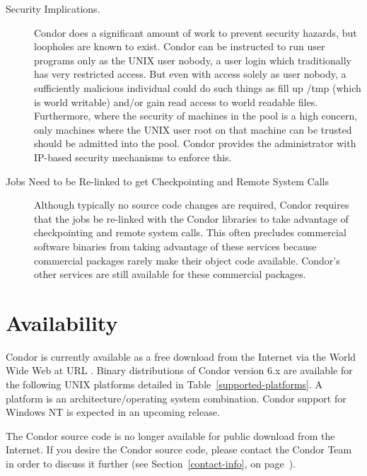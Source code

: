 \begin{description}
	\item[Security Implications.] Condor does a significant amount of work to prevent 
security hazards, but loopholes are known to exist.  Condor can be instructed 
to run user programs only as the UNIX user nobody, a user login which traditionally has very 
restricted access.  But even with access solely as user nobody, a sufficiently 
malicious individual could do such things as fill up /tmp (which is world writable) and/or gain 
read access to world readable files.
Furthermore, where the security of machines in the pool is a high concern, 
only machines where the UNIX user root on that machine can be trusted should be admitted
into the pool. Condor provides the administrator with IP-based security mechanisms 
to enforce this.

	\item[Jobs Need to be Re-linked to get Checkpointing and Remote System Calls] Although 
typically no source code changes are required,
Condor requires
that the jobs be re-linked with the Condor libraries to take
advantage of checkpointing and remote system calls. This often
precludes commercial software binaries from taking advantage of these services
because commercial packages rarely make their object code
available. 
Condor's other services are still available for these commercial packages.

\end{description}

\section{Availability}
Condor is currently available as a free download from the Internet via the World Wide Web at  
URL .
Binary distributions of Condor version 6.x are available for the following UNIX platforms 
detailed in Table~\ref{supported-platforms}.  A platform is an 
architecture/operating system combination.  Condor support for Windows NT is 
expected in an upcoming release.

The Condor source code is no longer available for public download from the Internet.  If you 
desire the Condor source code, please contact the Condor Team in order to discuss it further 
(see Section~\ref{contact-info}, on page~\pageref{contact-info}).

